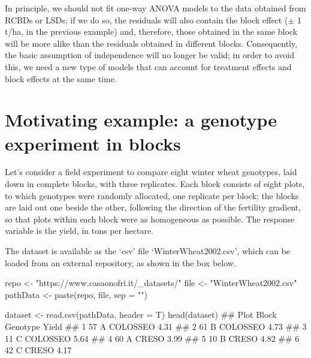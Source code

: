 \documentclass[a4paper,12pt,oneside]{book}
\newenvironment{Shaded}{\begin{snugshade}}{\end{snugshade}}
\newcommand{\StringTok}[1]{#1}
\newcommand{\DocumentationTok}[1]{#1}
\newcommand{\OtherTok}[1]{#1}
\newcommand{\FunctionTok}[1]{#1}
\newcommand{\AttributeTok}[1]{#1}
\newcommand{\NormalTok}[1]{#1}
\begin{document}
In principle, we should not fit one-way ANOVA models to the data obtained from RCBDs or LSDs; if we do so, the residuals will also contain the block effect (\(\pm\) 1 t/ha, in the previous example) and, therefore, those obtained in the same block will be more alike than the residuals obtained in different blocks. Consequently, the basic assumption of independence will no longer be valid; in order to avoid this, we need a new type of models that can account for treatment effects and block effects at the same time.

\hypertarget{motivating-example-a-genotype-experiment-in-blocks}{%
\section{Motivating example: a genotype experiment in blocks}\label{motivating-example-a-genotype-experiment-in-blocks}}

Let's consider a field experiment to compare eight winter wheat genotypes, laid down in complete blocks, with three replicates. Each block consists of eight plots, to which genotypes were randomly allocated, one replicate per block; the blocks are laid out one beside the other, following the direction of the fertility gradient, so that plots within each block were as homogeneous as possible. The response variable is the yield, in tons per hectare.

The dataset is available as the `csv' file `WinterWheat2002.csv', which can be loaded from an external repository, as shown in the box below.

\vspace{12pt}

\begin{Shaded}
\begin{Highlighting}[]
\NormalTok{repo }\OtherTok{\textless{}{-}} \StringTok{"https://www.casaonofri.it/\_datasets/"}
\NormalTok{file }\OtherTok{\textless{}{-}} \StringTok{"WinterWheat2002.csv"}
\NormalTok{pathData }\OtherTok{\textless{}{-}} \FunctionTok{paste}\NormalTok{(repo, file, }\AttributeTok{sep =} \StringTok{""}\NormalTok{)}

\NormalTok{dataset }\OtherTok{\textless{}{-}} \FunctionTok{read.csv}\NormalTok{(pathData, }\AttributeTok{header =}\NormalTok{ T)}
\FunctionTok{head}\NormalTok{(dataset)}
\DocumentationTok{\#\#   Plot Block Genotype Yield}
\DocumentationTok{\#\# 1   57     A COLOSSEO  4.31}
\DocumentationTok{\#\# 2   61     B COLOSSEO  4.73}
\DocumentationTok{\#\# 3   11     C COLOSSEO  5.64}
\DocumentationTok{\#\# 4   60     A    CRESO  3.99}
\DocumentationTok{\#\# 5   10     B    CRESO  4.82}
\DocumentationTok{\#\# 6   42     C    CRESO  4.17}
\end{Highlighting}
\end{Shaded}
\end{document}
